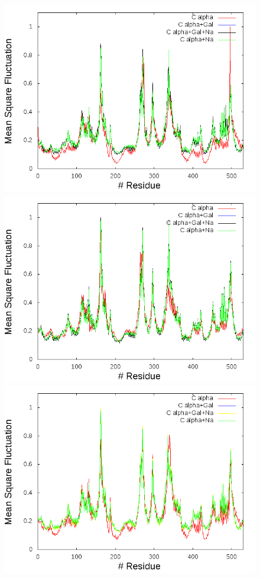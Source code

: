 \begin{figure}
  \includegraphics[scale=0.3]{./Kap4/ANM/ANM_server/grafica_9_A_n.png}
   \includegraphics[scale=0.3]{./Kap4/ANM/ANM_server/grafica_10_A_n.png}
    \includegraphics[scale=0.3]{./Kap4/ANM/ANM_server/grafica_11_A_n.png}

\end{figure}
